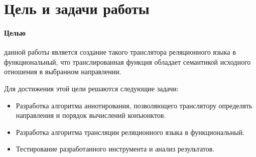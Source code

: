 \section{Цель и задачи работы}
\label{goals}

\paragraph{Целью} данной работы является создание такого транслятора реляционного языка в функциональный, что транслированная функция обладает семантикой исходного отношения в выбранном направлении.

Для достижения этой цели решаются следующие задачи:

\begin{itemize}
    \item Разработка алгоритма аннотирования, позволяющего транслятору определять направления и порядок вычислений конъюнктов.
    
    \item Разработка алгоритма трансляции реляционного языка в функциональный.
    
    \item Тестирование разработанного инструмента и анализ результатов.

\end{itemize}
